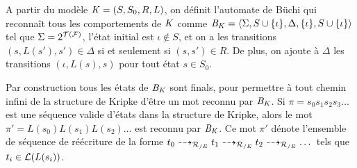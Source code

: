 \begin{definition}
  A partir du modèle $\mathit K = (S, S_0, R, L)$, on définit l'automate de Büchi
  qui reconnaît tous les comportements de $\mathit K$ comme $\mathit B_\mathit K =\langle \Sigma, S \cup \{\iota\}, \Delta, \{\iota\}, S \cup \{\iota\}\rangle$
  tel que $\Sigma = 2^{\mathcal{T(F)}}$, l'état initial est $\iota \not\in S$, et on a les transitions $(s, L(s'), s') \in \Delta$ si et seulement si $(s, s') \in R$.
  De plus, on ajoute à $\Delta$ les transitions $(\iota, L(s), s)$ pour tout état $s \in S_0$.
\end{definition}
Par construction tous les états de $\mathit B_\mathit K$ sont finals, pour permettre à tout chemin infini
de la structure de Kripke d'être un mot reconnu par $\mathit B_\mathit K$.
Si $\pi=s_0s_1s_2s_3\dots$ est une séquence valide d'états dans la structure de Kripke,
alors le mot $\pi' = L(s_0)L(s_1)L(s_2)\dots$ est reconnu par $\mathit B_\mathit K$.
Ce mot $\pi'$ dénote l'ensemble de séquence de réécriture de la forme
$t_0 \dashrightarrow_{\mathcal R_{/E}} t_1 \dashrightarrow_{\mathcal R_{/E}} t_2 \dashrightarrow_{\mathcal R_{/E}} \dots$ tels que $t_i \in \mathcal{L}(L(s_i))$.

